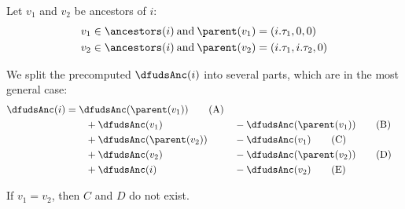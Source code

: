 Let $v_1$ and $v_2$ be ancestors of $i$:
\begin{align*}
	v_1 \in \ancestors(i) &\booland \parent(v_1) = (i.\tau_1, 0, 0) \\
	v_2 \in \ancestors(i) &\booland \parent(v_2) = (i.\tau_1, i.\tau_2, 0)
\end{align*}

We split the precomputed $\dfudsAnc(i)$ into several parts, which are in the most general case:
\begin{alignat}{2}
	\dfudsAnc(i) &= \dfudsAnc(\parent(v_1)) \tag{A}\\
	&\qquad + \dfudsAnc(v_1) &&- \dfudsAnc(\parent(v_1)) \tag{B}\\
	&\qquad + \dfudsAnc(\parent(v_2)) &&- \dfudsAnc(v_1) \tag{C}\\
	&\qquad + \dfudsAnc(v_2) &&- \dfudsAnc(\parent(v_2)) \tag{D}\\
	&\qquad + \dfudsAnc(i) &&- \dfudsAnc(v_2) \tag{E}
\end{alignat}

If $v_1 = v_2$, then $C$ and $D$ do not exist.

